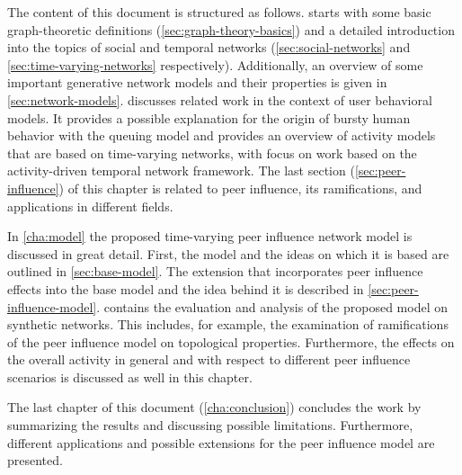 The content of this document is structured as follows.
 starts with some basic graph-theoretic definitions (\cref{sec:graph-theory-basics}) and a detailed introduction into the topics of social and temporal networks (\cref{sec:social-networks} and \cref{sec:time-varying-networks} respectively).
Additionally, an overview of some important generative network models and their properties is given in \cref{sec:network-models}.
 discusses related work in the context of user behavioral models.
It provides a possible explanation for the origin of bursty human behavior with the queuing model and provides an overview of activity models that are based on time-varying networks, with focus on work based on the activity-driven temporal network framework.
The last section (\cref{sec:peer-influence}) of this chapter is related to peer influence, its ramifications, and applications in different fields.

In \cref{cha:model} the proposed time-varying peer influence network model is discussed in great detail.
First, the model and the ideas on which it is based are outlined in \cref{sec:base-model}.
The extension that incorporates peer influence effects into the base model and the idea behind it is described in \cref{sec:peer-influence-model}.
 contains the evaluation and analysis of the proposed model on synthetic networks.
This includes, for example, the examination of ramifications of the peer influence model on topological properties.
Furthermore, the effects on the overall activity in general and with respect to different peer influence scenarios is discussed as well in this chapter.

The last chapter of this document (\cref{cha:conclusion}) concludes the work
by summarizing the results and discussing possible limitations.
Furthermore, different applications and possible extensions for the peer influence model are presented.
